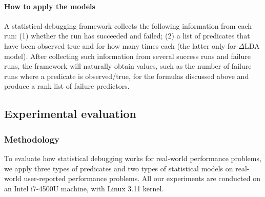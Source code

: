 \paragraph{How to apply the models}
A statistical debugging framework collects the following
information from each run: (1) whether the run has succeeded and failed;
(2) a list of predicates that have been observed true and for how many 
times each (the latter only for $\Delta$LDA model). 
After collecting such information from
several success runs and failure runs, the framework will naturally obtain
values, such as the number of failure runs where a predicate is observed/true,
for the formulas discussed above and produce a rank list of failure predictors.




\subsection{Experimental evaluation}
\label{sec:inhouse_results}
\subsubsection{Methodology}
\label{sec:inhouse_meth}
To evaluate how statistical debugging works for real-world performance problems,
we apply three types of predicates and two types of statistical models on 
real-world user-reported performance problems.
All our experiments are conducted on an Intel i7-4500U machine, with Linux 3.11 kernel.

